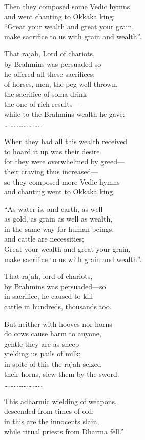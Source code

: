 \begin{myquote}
Then they composed some Vedic hymns\\ and went chanting to Okkāka king:\\ “Great your wealth and great your grain,\\ make sacrifice to us with grain and wealth”.

That rajah, Lord of chariots,\\ by Brahmins was persuaded so\\ he offered all these sacrifices:\\ of horses, men, the peg well-thrown,\\ the sacrifice of soma drink\\ the one of rich results—\\ while to the Brahmins wealth he gave:\\ ……………………

 When they had all this wealth received\\ to hoard it up was their desire\\ for they were overwhelmed by greed—\\ their craving thus increased—\\ so they composed more Vedic hymns\\ and chanting went to Okkāka king.

\vspace{0.1cm}

“As water is, and earth, as well\\ as gold, as grain as well as wealth,\\ in the same way for human beings,\\ and cattle are necessities;\\ Great your wealth and great your grain,\\ make sacrifice to us with grain and wealth”.

\vspace{0.1cm}

That rajah, lord of chariots,\\ by Brahmins was persuaded—so\\ in sacrifice, he caused to kill\\ cattle in hundreds, thousands too.

\vspace{0.1cm}

But neither with hooves nor horns\\ do cows cause harm to anyone,\\ gentle they are as sheep\\ yielding us pails of milk;\\ in spite of this the rajah seized\\ their horns, slew them by the sword.\\ ……………………

\vspace{0.1cm}

This adharmic wielding of weapons,\\ descended from times of old:\\ in this are the innocents slain,\\ while ritual priests from Dharma fell.”
\end{myquote}

